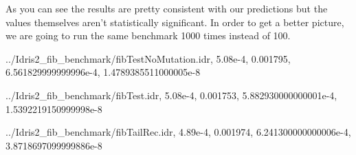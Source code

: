 \documentclass[
]{article}
\newenvironment{Shaded}{}{}
\newcommand{\DataTypeTok}[1]{\textcolor[rgb]{0.56,0.13,0.00}{#1}}
\newcommand{\FloatTok}[1]{\textcolor[rgb]{0.25,0.63,0.44}{#1}}
\newcommand{\NormalTok}[1]{#1}
\newcommand{\OperatorTok}[1]{\textcolor[rgb]{0.40,0.40,0.40}{#1}}
\begin{document}
As you can see the results are pretty consistent with our predictions
but the values themselves aren't statistically significant. In order to
get a better picture, we are going to run the same benchmark 1000 times
instead of 100.

\begin{Shaded}
\begin{Highlighting}[]
\OperatorTok{../}\DataTypeTok{Idris2\_fib\_benchmark}\OperatorTok{/}\NormalTok{fibTestNoMutation}\OperatorTok{.}\NormalTok{idr,}
\FloatTok{5.08e{-}4}\NormalTok{,}
\FloatTok{0.001795}\NormalTok{,}
\FloatTok{6.561829999999996e{-}4}\NormalTok{,}
\FloatTok{1.4789385511000005e{-}8}

\OperatorTok{../}\DataTypeTok{Idris2\_fib\_benchmark}\OperatorTok{/}\NormalTok{fibTest}\OperatorTok{.}\NormalTok{idr,}
\FloatTok{5.08e{-}4}\NormalTok{,}
\FloatTok{0.001753}\NormalTok{,}
\FloatTok{5.882930000000001e{-}4}\NormalTok{,}
\FloatTok{1.5392219150999998e{-}8}

\OperatorTok{../}\DataTypeTok{Idris2\_fib\_benchmark}\OperatorTok{/}\NormalTok{fibTailRec}\OperatorTok{.}\NormalTok{idr,}
\FloatTok{4.89e{-}4}\NormalTok{,}
\FloatTok{0.001974}\NormalTok{,}
\FloatTok{6.241300000000006e{-}4}\NormalTok{,}
\FloatTok{3.8718697099999886e{-}8}


\end{Highlighting}
\end{Shaded}
\end{document}
